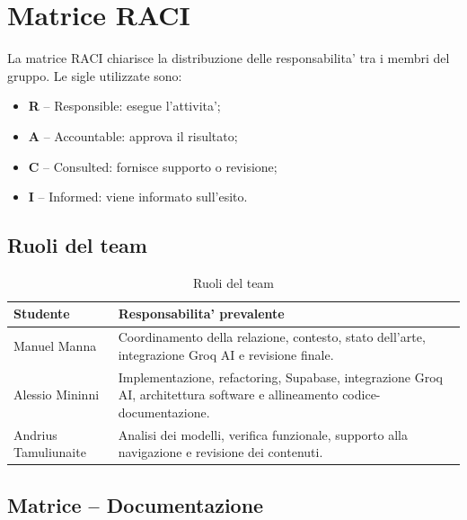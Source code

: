 \section{Matrice RACI}

La matrice RACI chiarisce la distribuzione delle responsabilita' tra i membri del gruppo. Le sigle utilizzate sono:

\begin{itemize}
    \item \textbf{R} -- Responsible: esegue l'attivita';
    \item \textbf{A} -- Accountable: approva il risultato;
    \item \textbf{C} -- Consulted: fornisce supporto o revisione;
    \item \textbf{I} -- Informed: viene informato sull'esito.
\end{itemize}

\subsection{Ruoli del team}

\begin{table}[H]
\centering
\renewcommand{\arraystretch}{1.25}
\begin{tabularx}{\textwidth}{|l|X|}
\hline
\textbf{Studente} & \textbf{Responsabilita' prevalente} \\
\hline
Manuel Manna & Coordinamento della relazione, contesto, stato dell'arte, integrazione Groq AI e revisione finale. \\
\hline
Alessio Mininni & Implementazione, refactoring, Supabase, integrazione Groq AI, architettura software e allineamento codice-documentazione. \\
\hline
Andrius Tamuliunaite & Analisi dei modelli, verifica funzionale, supporto alla navigazione e revisione dei contenuti. \\
\hline
\end{tabularx}
\caption{Ruoli del team}
\label{tab:team-raci}
\end{table}

\subsection{Matrice -- Documentazione}

